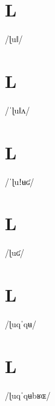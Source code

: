 \documentclass[10pt,a4paper,twoside]{book}
\begin{document}
\section*{L}

\begin{multicols}{3}
 {/ɭuǁ/} {}
\end{multicols}

\section*{L}

\begin{multicols}{3}
 {/ˈɭuǁʌ/} {}
\end{multicols}

\section*{L}

\begin{multicols}{3}
 {/ˈɭuǃʉʛ/} {}
\end{multicols}

\section*{L}

\begin{multicols}{3}
 {/ɭuʛ/} {}
\end{multicols}

\section*{L}

\begin{multicols}{3}
 {/ɭuqˈqʉ/} {}
\end{multicols}

\section*{L}

\begin{multicols}{3}
 {/ɭuqˈqʉbʁɶ/} {}
\end{multicols}
\end{document}
